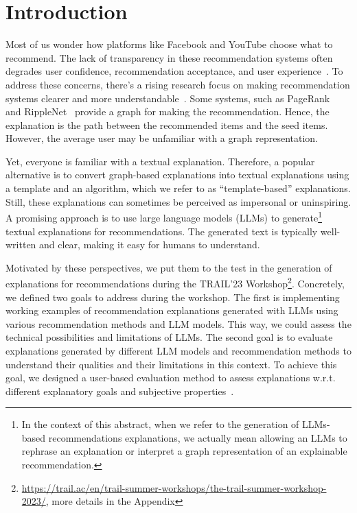 \section{Introduction}

Most of us wonder how platforms like Facebook and YouTube choose what to recommend. The lack of transparency in these recommendation systems often degrades user confidence, recommendation acceptance, and user experience~\cite{Tintarev2015}. To address these concerns, there's a rising research focus on making recommendation systems clearer and more understandable~\cite{Papadimitriou2012, Tintarev2015, Zhang2020}. Some systems, such as PageRank~\cite{haveliwala2003personalizedpagerank} and RippleNet~\cite{wang2018ripplenet} provide a graph for making the recommendation. Hence, the explanation is the path between the recommended items and the seed items. However, the average user may be unfamiliar with a graph representation.

Yet, everyone is familiar with a textual explanation. Therefore, a popular alternative is to convert graph-based explanations into textual explanations using a template and an algorithm, which we refer to as “template-based” explanations. Still, these explanations can sometimes be perceived as impersonal or uninspiring. A promising approach is to use large language models (LLMs) to generate\footnote{In the context of this abstract, when we refer to the generation of LLMs-based recommendations explanations, we actually mean allowing an LLMs to rephrase an explanation or interpret a graph representation of an explainable recommendation.} textual explanations for recommendations. The generated text is typically well-written and clear, making it easy for humans to understand\cite{bommasani2021foundationModels}.

Motivated by these perspectives, we put them to the test in the generation of explanations for recommendations during the TRAIL’23 Workshop\footnote{\url{https://trail.ac/en/trail-summer-workshops/the-trail-summer-workshop-2023/}, more details in the Appendix}. Concretely, we defined two goals to address during the workshop.
The first is implementing working examples of recommendation explanations generated with LLMs using various recommendation methods and LLM models. This way, we could assess the technical possibilities and limitations of LLMs.
The second goal is to evaluate explanations generated by different LLM models and recommendation methods to understand their qualities and their limitations in this context. To achieve this goal, we designed a user-based evaluation method to assess explanations w.r.t. different explanatory goals and subjective properties~\cite{Tintarev2015}.
